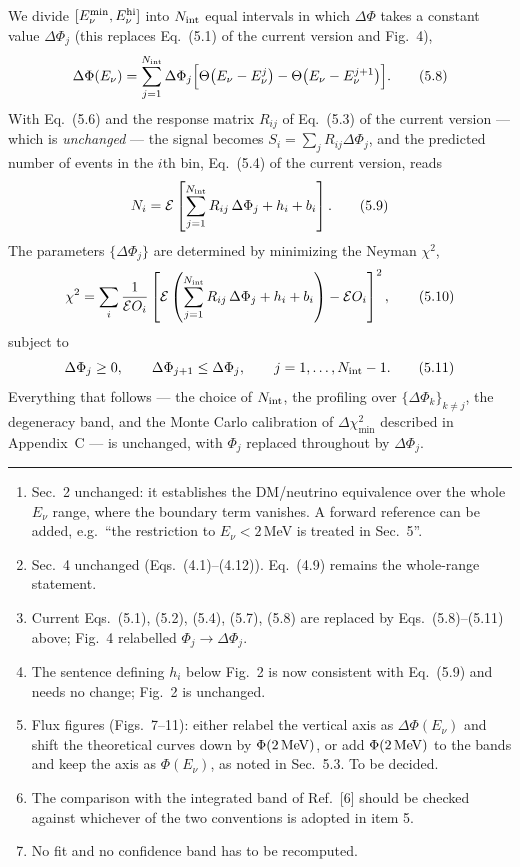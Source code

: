 \documentclass[11pt,a4paper]{article}
\newcommand{\Ev}{E_\nu}
\newcommand{\Etwo}{E_\nu^{\rm hi}}
\newcommand{\Emin}{E_\nu^{\rm min}}
\newcommand{\dPhi}{\Delta\Phi}
\begin{document}
We divide $[\Emin,\Etwo]$ into $N_{\rm int}$ equal intervals in which $\dPhi$ takes a constant
value $\dPhi_j$ (this replaces Eq.~(5.1) of the current version and Fig.~4),
\begin{equation}
\dPhi(\Ev)=\sum_{j=1}^{N_{\rm int}}\dPhi_j\Big[\Theta\big(\Ev-\Ev^j\big)-\Theta\big(\Ev-\Ev^{j+1}\big)\Big].
\tag{5.8}
\end{equation}
With Eq.~(5.6) and the response matrix $R_{ij}$ of Eq.~(5.3) of the current version --- which is
\emph{unchanged} --- the signal becomes $S_i=\sum_j R_{ij}\dPhi_j$, and the predicted number of
events in the $i$th bin, Eq.~(5.4) of the current version, reads
\begin{equation}
N_i=\mathcal E\left[\sum_{j=1}^{N_{\rm int}}R_{ij}\,\dPhi_j+h_i+b_i\right].
\tag{5.9}
\end{equation}
The parameters $\{\dPhi_j\}$ are determined by minimizing the Neyman $\chi^2$,
\begin{equation}
\chi^2=\sum_{i}\frac{1}{\mathcal E O_i}
\left[\mathcal E\left(\sum_{j=1}^{N_{\rm int}}R_{ij}\,\dPhi_j+h_i+b_i\right)-\mathcal E O_i\right]^{2},
\tag{5.10}
\end{equation}
subject to
\begin{equation}
\dPhi_j\ge0,\qquad \dPhi_{j+1}\le\dPhi_j,\qquad j=1,\dots,N_{\rm int}-1 .
\tag{5.11}
\end{equation}
Everything that follows --- the choice of $N_{\rm int}$, the profiling over
$\{\dPhi_k\}_{k\neq j}$, the degeneracy band, and the Monte Carlo calibration of
$\Delta\chi^2_{\min}$ described in Appendix~C --- is unchanged, with $\Phi_j$ replaced
throughout by $\dPhi_j$.

\vspace{4mm}
\hrule
\vspace{3mm}
\begin{enumerate}\itemsep1pt
\item Sec.~2 unchanged: it establishes the DM/neutrino equivalence over the whole $\Ev$ range,
where the boundary term vanishes. A forward reference can be added, e.g.\ ``the restriction to
$\Ev<2\,$MeV is treated in Sec.~5''.
\item Sec.~4 unchanged (Eqs.~(4.1)--(4.12)). Eq.~(4.9) remains the whole-range statement.
\item Current Eqs.~(5.1), (5.2), (5.4), (5.7), (5.8) are replaced by Eqs.~(5.8)--(5.11) above;
Fig.~4 relabelled $\Phi_j\to\dPhi_j$.
\item The sentence defining $h_i$ below Fig.~2 is now consistent with Eq.~(5.9) and needs no
change; Fig.~2 is unchanged.
\item Flux figures (Figs.~7--11): either relabel the vertical axis as $\dPhi(\Ev)$ and shift the
theoretical curves down by $\Phi(2\,{\rm MeV})$, or add $\Phi(2\,{\rm MeV})$ to the bands and keep
the axis as $\Phi(\Ev)$, as noted in Sec.~5.3. To be decided.
\item The comparison with the integrated band of Ref.~[6] should be checked against whichever of
the two conventions is adopted in item 5.
\item No fit and no confidence band has to be recomputed.
\end{enumerate}
\end{document}
